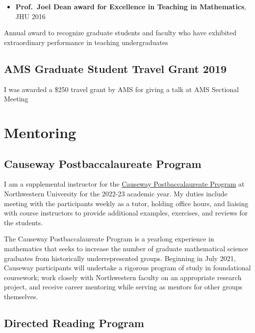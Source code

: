 \documentclass[
]{report}
\providecommand{\tightlist}{%
  \setlength{\itemsep}{0pt}\setlength{\parskip}{0pt}}
\begin{document}
\begin{itemize}
\tightlist
\item
  \textbf{Prof.~Joel Dean award for Excellence in Teaching in Mathematics}, JHU 2016
\end{itemize}

Annual award to recognize graduate students and faculty who have exhibited extraordinary performance in teaching undergraduates

\hypertarget{ams-graduate-student-travel-grant-2019}{%
\section{AMS Graduate Student Travel Grant 2019}\label{ams-graduate-student-travel-grant-2019}}

I was awarded a \$250 travel grant by AMS for giving a talk at AMS Sectional Meeting

\hypertarget{mentoring-1}{%
\chapter{Mentoring}\label{mentoring-1}}

\hypertarget{causeway-postbaccalaureate-program}{%
\section{Causeway Postbaccalaureate Program}\label{causeway-postbaccalaureate-program}}

I am a supplemental instructor for the \href{https://sites.northwestern.edu/causeway/}{Causeway Postbaccalaureate Program}
at Northwestern University for the 2022-23 academic year.
My duties include meeting with the participants weekly as a tutor, holding office hours, and liaising with course instructors to provide additional examples, exercises, and reviews for the students.

The Causeway Postbaccalaureate Program is a yearlong experience in mathematics that seeks to increase the number of graduate mathematical science graduates from historically underrepresented groups. Beginning in July 2021, Causeway participants will undertake a rigorous program of study in foundational coursework; work closely with Northwestern faculty on an appropriate research project, and receive career mentoring while serving as mentors for other groups themselves.

\hypertarget{directed-reading-program}{%
\section{Directed Reading Program}\label{directed-reading-program}}
\end{document}
